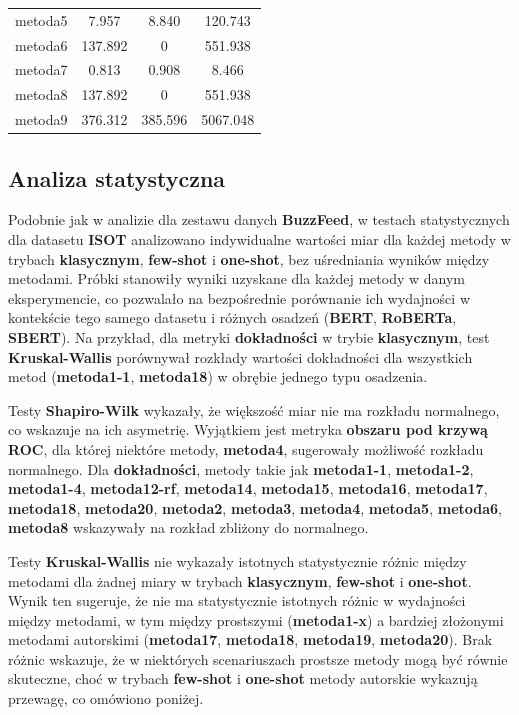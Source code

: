 \begin{table}[H]
\begin{tabular}{lccc}
		metoda5           & 7.957         & 8.840            & 120.743        \\
		metoda6           & 137.892       &   0              & 551.938        \\
		metoda7           & 0.813         & 0.908            & 8.466          \\
		metoda8           & 137.892       &   0              & 551.938        \\
		metoda9           & 376.312       & 385.596          & 5067.048       \\
		\bottomrule
	\end{tabular}
\end{table}

\subsection{Analiza statystyczna}
Podobnie jak w analizie dla zestawu danych \textbf{BuzzFeed}, w testach statystycznych dla datasetu \textbf{ISOT} analizowano indywidualne wartości miar dla każdej metody w trybach \textbf{klasycznym}, \textbf{few-shot} i \textbf{one-shot}, bez uśredniania wyników między metodami. Próbki stanowiły wyniki uzyskane dla każdej metody w danym eksperymencie, co pozwalało na bezpośrednie porównanie ich wydajności w kontekście tego samego datasetu i różnych osadzeń (\textbf{BERT}, \textbf{RoBERTa}, \textbf{SBERT}). Na przykład, dla metryki \textbf{dokładności} w trybie \textbf{klasycznym}, test \textbf{Kruskal-Wallis} porównywał rozkłady wartości dokładności dla wszystkich metod (\textbf{metoda1-1}, \textbf{metoda18}) w obrębie jednego typu osadzenia.

Testy \textbf{Shapiro-Wilk} wykazały, że większość miar nie ma rozkładu normalnego, co wskazuje na ich asymetrię. Wyjątkiem jest metryka \textbf{obszaru pod krzywą ROC}, dla której niektóre metody, \textbf{metoda4}, sugerowały możliwość rozkładu normalnego. Dla \textbf{dokładności}, metody takie jak \textbf{metoda1-1}, \textbf{metoda1-2}, \textbf{metoda1-4}, \textbf{metoda12-rf}, \textbf{metoda14}, \textbf{metoda15}, \textbf{metoda16}, \textbf{metoda17}, \textbf{metoda18}, \textbf{metoda20}, \textbf{metoda2}, \textbf{metoda3}, \textbf{metoda4}, \textbf{metoda5}, \textbf{metoda6}, \textbf{metoda8} wskazywały na rozkład zbliżony do normalnego.

Testy \textbf{Kruskal-Wallis} nie wykazały istotnych statystycznie różnic między metodami dla żadnej miary w trybach \textbf{klasycznym}, \textbf{few-shot} i \textbf{one-shot}. Wynik ten sugeruje, że nie ma statystycznie istotnych różnic w wydajności między metodami, w tym między prostszymi (\textbf{metoda1-x}) a bardziej złożonymi metodami autorskimi (\textbf{metoda17}, \textbf{metoda18}, \textbf{metoda19}, \textbf{metoda20}). Brak różnic wskazuje, że w niektórych scenariuszach prostsze metody mogą być równie skuteczne, choć w trybach \textbf{few-shot} i \textbf{one-shot} metody autorskie wykazują przewagę, co omówiono poniżej.

